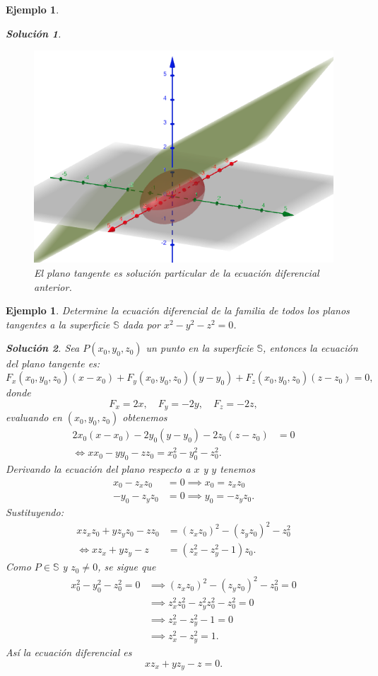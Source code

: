 \documentclass[11pt,letterpaper,draft]{report}
\newtheorem{example}[defn]{Ejemplo}
\newtheorem*{sol}{Solución}
\newcommand\<{\langle}
\renewcommand\>{\rangle}
\begin{document}
\begin{example}
\begin{sol}
    \begin{figure}[ht]
      \centering
      \includegraphics[width=0.5\linewidth]{imgs/chap1-tangent.png}
      \caption{El plano tangente es solución particular de
      la ecuación diferencial anterior.}%
      \label{fig:chap1-tangent}
    \end{figure}
  \end{sol}
\end{example}

\begin{example}
  Determine la ecuación diferencial de la familia de todos los planos tangentes
  a la superficie $\mathbb{S}$ dada por $x^2 - y^2 - z^2 = 0$.

  \begin{sol}
    Sea $P(x_0,y_0,z_0)$ un punto en la superficie $\mathbb{S}$, entonces la
    ecuación del plano tangente es:
    \[
    F_x(x_0,y_0,z_0)(x-x_0) + F_y(x_0,y_0,z_0)(y-y_0) + F_z(x_0,y_0,z_0)(z-z_0)
    = 0,
    \] donde 
    \[
    F_x = 2x, \quad F_y = -2y, \quad F_z = -2z,
    \] evaluando en $(x_0,y_0,z_0)$ obtenemos
    \begin{align*}
      2x_0(x-x_0) - 2y_0(y-y_0) - 2z_0(z-z_0) &= 0\\
      \iff xx_0 - yy_0 - zz_0 = x_0^2 - y_0^2 - z_0^2.
    \end{align*}
    Derivando la ecuación del plano respecto a $x$ y $y$ tenemos
    \begin{align*}
      x_0 - z_x z_0 &= 0 \implies x_0 = z_x z_0\\
      -y_0 - z_y z_0 &= 0 \implies y_0 = -z_y z_0.
    \end{align*}
    Sustituyendo:
    \begin{align*}
      x z_x z_0 + y z_y z_0 - z z_0 &= (z_x z_0)^2 - (z_y z_0)^2 - z_0^2\\
      \iff x z_x + y z_y - z &= (z_x^2 - z_y^2 - 1) z_0.
    \end{align*}
    Como $P \in \mathbb{S}$ y $z_0 \neq 0$, se sigue que
    \begin{align*}
      x_0^2 - y_0^2 - z_0^2 = 0 &\implies (z_x z_0)^2 - (z_y z_0)^2 - z_0^2 =
      0\\
                                &\implies z_x^2 z_0^2 - z_y^2 z_0^2 - z_0^2 =
                                0\\
                                &\implies z_x^2 - z_y^2 - 1 = 0\\
                                &\implies z_x^2 - z_y^2 = 1.
    \end{align*} Así la ecuación diferencial es
    \[
    x z_x + y z_y - z = 0.
    \] 
  \end{sol}
\end{example}
\end{document}

